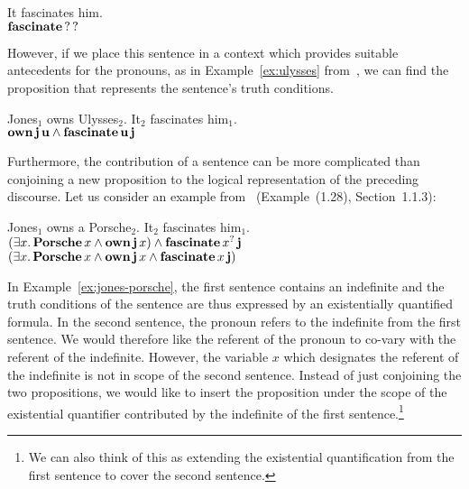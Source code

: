\begin{exe}
  \ex It fascinates him. \label{ex:no-antecedent} \\
  $\textbf{fascinate}\,?\,?$
\end{exe}

However, if we place this sentence in a context which provides suitable
antecedents for the pronouns, as in Example~\ref{ex:ulysses}
from~\cite{kamp1993discourse}, we can find the proposition that represents
the sentence's truth conditions.

\begin{exe}
  \ex Jones$_1$ owns Ulysses$_2$. It$_2$ fascinates him$_1$. \label{ex:ulysses} \\
  $\textbf{own}\,\textbf{j}\,\textbf{u} \land \textbf{fascinate}\,\textbf{u}\,\textbf{j}$
\end{exe}

Furthermore, the contribution of a sentence can be more complicated than
conjoining a new proposition to the logical representation of the preceding
discourse. Let us consider an example from~\cite{kamp1993discourse}
(Example~(1.28), Section~1.1.3):

\begin{exe}
  \ex Jones$_1$ owns a Porsche$_2$. It$_2$ fascinates him$_1$. \label{ex:jones-porsche} \\
  $(\exists x.\, \textbf{Porsche}\,x \land \textbf{own}\,\textbf{j}\,x)
  \land \textbf{fascinate}\,x^?\,\textbf{j}$ \\
  $(\exists x.\, \textbf{Porsche}\,x \land \textbf{own}\,\textbf{j}\,x
  \land \textbf{fascinate}\,x\,\textbf{j})$ \\
\end{exe}

In Example~\ref{ex:jones-porsche}, the first sentence contains an
indefinite and the truth conditions of the sentence are thus expressed by
an existentially quantified formula. In the second sentence, the pronoun
refers to the indefinite from the first sentence. We would therefore like
the referent of the pronoun to co-vary with the referent of the
indefinite. However, the variable $x$ which designates the referent of the
indefinite is not in scope of the second sentence. Instead of just
conjoining the two propositions, we would like to insert the proposition
under the scope of the existential quantifier contributed by the indefinite
of the first sentence.\footnote{We can also think of this as extending the
  existential quantification from the first sentence to cover the second
  sentence.}

